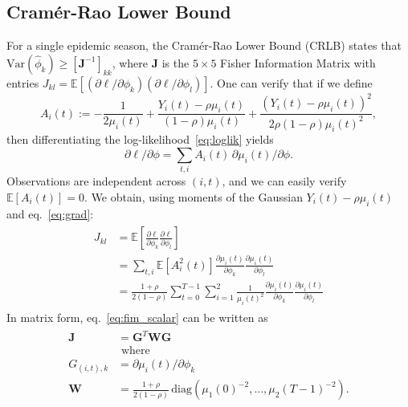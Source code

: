 \subsection{Cram\'er-Rao Lower Bound}\label{subsec:crlb}
For a single epidemic season, the Cram\'er-Rao Lower Bound (CRLB)
states that $\text{Var}(\hat\phi_k) \geq [\mathbf{J}^{-1}]_{kk}$,
where $\mathbf{J}$ is the $5 \times 5$ Fisher Information Matrix with
entries $J_{kl} =
\mathbb{E}[(\partial\ell/\partial\phi_k)(\partial\ell/\partial\phi_l)]$.
One can verify that if we define
\begin{equation*}
A_i(t) := -\frac{1}{2\mu_i(t)} + \frac{Y_i(t) -
  \rho\mu_i(t)}{(1{-}\rho)\mu_i(t)} + \frac{(Y_i(t) -
  \rho\mu_i(t))^2}{2\rho(1{-}\rho)\mu_i(t)^2},
\end{equation*}
then differentiating the log-likelihood~\eqref{eq:loglik} yields
%
%
\begin{equation}\label{eq:grad}
\partial \ell / \partial \phi = \sum_{t,i} A_i(t)\,\partial
\mu_i(t)/\partial \phi.
\end{equation}
%
%
Observations are independent across $(i,t)$, and we can easily verify
$\mathbb{E}[A_i(t)] = 0$. We obtain, using moments of the Gaussian
$Y_i(t) -\rho \mu_i(t)$ and eq.~\eqref{eq:grad}:
\begin{align}\label{eq:fim_scalar}
  \begin{split}
    J_{kl} &= \mathbb{E}\left [\frac{\partial \ell}{\partial \phi_k}\frac{\partial \ell}{\partial \phi_l}\right ] \\
    &=\sum_{t,i} \mathbb{E}[A_i^2(t)] \frac{\partial \mu_i(t)}{\partial \phi_k}  \frac{\partial \mu_i(t)}{\partial \phi_l} \\
    &= \frac{1+\rho}{2(1-\rho)}\sum_{t=0}^{T-1}\sum_{i=1}^{2}
    \frac{1}{\mu_i(t)^2} \frac{\partial \mu_i(t)}{\partial \phi_k}
    \frac{\partial \mu_i(t)}{\partial \phi_l}
  \end{split}
\end{align}
%
%
In matrix form, eq.~\eqref{eq:fim_scalar} can be written as 
\begin{align}\label{eq:fim}
  \begin{split}
  \mathbf{J} &= \mathbf{G}^T \mathbf{W} \mathbf{G} \\
  &\text{ where } \\
  G_{(i,t),k} &= \partial \mu_i(t)/\partial \phi_k \\
  \mathbf{W} &= \frac{1+\rho}{2(1-\rho)}\,\text{diag}(\mu_1(0)^{-2},
  \ldots, \mu_2(T{-}1)^{-2}).
  \end{split}
\end{align}

